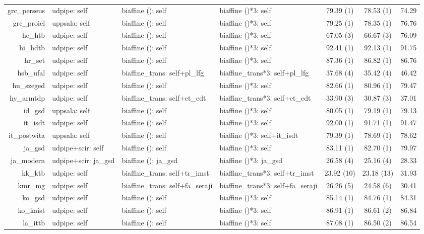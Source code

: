 \documentclass[11pt,a4paper]{article}
\begin{document}
\begin{table*}[t]
\begin{tabular}{rlllccc}
		grc\_perseus & udpipe: self & biaffine (): self & biaffine ()*3: self & 79.39 (1) & 78.53 (1) & 74.29 \\
		grc\_proiel & uppsala: self & biaffine (): self & biaffine ()*3: self & 79.25 (1) & 78.35 (1) & 76.76 \\
		he\_htb & udpipe: self & biaffine (): self & biaffine ()*3: self & 67.05 (3) & 66.67 (3) & 76.09 \\
		hi\_hdtb & udpipe: self & biaffine (): self & biaffine ()*3: self & 92.41 (1) & 92.13 (1) & 91.75 \\
		hr\_set & udpipe: self & biaffine (): self & biaffine ()*3: self & 87.36 (1) & 86.82 (1) & 86.76 \\
		hsb\_ufal & udpipe: self & biaffine\_trans: self+pl\_lfg & biaffine\_trans*3: self+pl\_lfg & 37.68 (4) & 35.42 (4) & 46.42 \\
		hu\_szeged & udpipe: self & biaffine (): self & biaffine ()*3: self & 82.66 (1) & 80.96 (1) & 79.47 \\
		hy\_armtdp & udpipe: self & biaffine\_trans: self+et\_edt & biaffine\_trans*3: self+et\_edt & 33.90 (3) & 30.87 (3) & 37.01\\
		id\_gsd & uppsala: self & biaffine (): self & biaffine ()*3: self & 80.05 (1) & 79.19 (1) & 79.13 \\
		it\_isdt & udpipe: self & biaffine (): self & biaffine ()*3: self & 92.00 (1) & 91.71 (1) & 91.47 \\
		it\_postwita & uppsala: self & biaffine (): self & biaffine ()*3: self+it\_isdt & 79.39 (1) & 78.69 (1) & 78.62 \\
		ja\_gsd & udpipe+scir: self & biaffine (): self & biaffine ()*3: self & 83.11 (1) & 82.70 (1) & 79.97 \\
		ja\_modern & udpipe+scir: ja\_gsd & biaffine (): ja\_gsd & biaffine ()*3: ja\_gsd & 26.58 (4) &  25.16 (4) & 28.33 \\
		kk\_ktb & udpipe: self & biaffine\_trans: self+tr\_imst & biaffine\_trans*3: self+tr\_imst & 23.92 (10) & 23.18 (13) & 31.93 \\
		kmr\_mg & udpipe: self & biaffine\_trans: self+fa\_seraji & biaffine\_trans*3: self+fa\_seraji & 26.26 (5) & 24.58 (6) & 30.41\\
		ko\_gsd & udpipe: self & biaffine (): self & biaffine ()*3: self & 85.14 (1) & 84.76 (1) & 84.31 \\
		ko\_kaist & udpipe: self & biaffine (): self & biaffine ()*3: self & 86.91 (1) & 86.61 (2) & 86.84 \\
		la\_ittb & udpipe: self & biaffine (): self & biaffine ()*3: self & 87.08 (1) & 86.50 (2) & 86.54\\

\end{tabular}
\end{table*}
\end{document}
